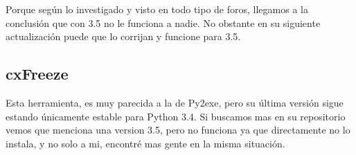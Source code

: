 Porque según lo investigado y visto en todo tipo de foros, llegamos a la conclusión que con 3.5 no le funciona a nadie.
No obstante en su siguiente actualización puede que lo corrijan y funcione para 3.5.

\subsection{cxFreeze}
Esta herramienta, es muy parecida a la de Py2exe, pero su última versión sigue estando únicamente estable para Python 3.4. 
Si buscamos mas en su repositorio vemos que menciona una version 3.5, pero no funciona ya que directamente no lo instala, y no solo a mi, encontré mas gente en la misma situación.




